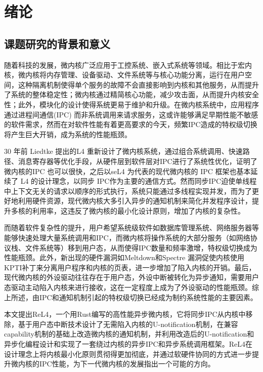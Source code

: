 \chapter{绪论}
\label{chap:intro}
\section{课题研究的背景和意义}

随着科技的发展，微内核广泛应用于工控系统、嵌入式系统等领域。相比于宏内核，微内核将内存管理、设备驱动、文件系统等与核心功能分离，运行在用户空间，这种隔离机制使得单个服务的故障不会直接影响到内核和其他服务，从而提升了系统的整体稳定性\cite{Thallapally2024}；微内核通过精简核心功能，减少攻击面，从而提升内核安全性；此外，模块化的设计使得系统更易于维护和升级。在微内核系统中，应用程序通过进程间通信(IPC) 而非系统调用来请求服务，这或许能够满足早期性能不敏感的软件需求，然而在对软件性能有着更高要求的今天，频繁IPC造成的特权级切换将产生巨大开销，成为系统的性能瓶颈\cite{liedtke1996toward}。

30 年前 Liedtke 提出的L4 \cite{liedtke1993improving} 重新设计了微内核系统，通过组合系统调用、快速路径、消息寄存器等优化手段，从硬件层到软件层对IPC进行了系统性优化，证明了微内核的IPC 也可以很快，之后以seL4 \cite{klein2009sel4} 为代表的现代微内核的 IPC 框架也基本延续了 L4 的设计理念，以同步 IPC作为主要的通信方式。然而同步IPC迫使单线程中上下文无关的请求以顺序的形式执行，系统只能通过多线程实现并发，而为了更好地利用硬件资源，现代微内核大多引入异步的通知机制来简化并发程序设计，提升多核的利用率，这违反了微内核的最小化设计原则，增加了内核的复杂性。

而随着软件复杂性的提升，用户希望系统级软件如数据库管理系统、网络服务器等能够快速处理大量系统调用和IPC\cite{Caruso2021}，而微内核将操作系统的大部分服务（如网络协议栈、文件系统等）移到用户态，从而使得IPC数量和频率激增，特权级切换成为性能瓶颈。此外，新出现的硬件漏洞如Meltdown\cite{lipp2020meltdown}和Spectre\cite{kocher2020spectre} 漏洞促使内核使用 KPTI补丁\cite{kernel_pti}来分离用户程序和内核的页表，进一步增加了陷入内核的开销。最后，现代微内核的外设驱动往往存在于用户态，外设中断被转化为异步通知，需要用户态驱动主动陷入内核来进行接收，这在一定程度上成为了外设驱动的性能瓶颈\cite{blackham2012improving}。综上所述，由IPC和通知机制引起的特权级切换已经成为制约系统性能的主要因素。

本文提出ReL4，一个用Rust编写的高性能异步微内核，它将同步IPC从内核中移除，基于用户态中断技术设计了无需陷入内核的U-notification机制，在兼容capability机制的基础上改造微内核的通知机制，并利用改造后的U-notification和异步化编程设计和实现了一套绕过内核的异步IPC和异步系统调用框架。ReL4在设计理念上将内核最小化原则贯彻得更加彻底，并通过软硬件协同的方式进一步提升微内核的IPC性能，为下一代微内核的发展指出一个可能的方向。

